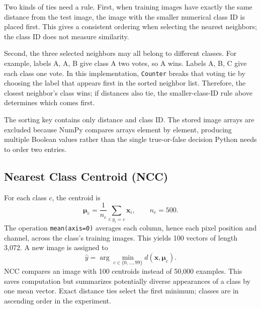 \documentclass[letterpaper,journal]{IEEEtran}
\newcommand{\code}[1]{\texttt{#1}}
\begin{document}
Two kinds of ties need a rule. First, when training images have exactly the
same distance from the test image, the image with the smaller numerical
class ID is placed first. This gives a consistent ordering when selecting
the nearest neighbors; the class ID does not measure similarity.

Second, the three selected neighbors may all belong to different classes.
For example, labels A, A, B give class A two votes, so A wins. Labels A, B, C
give each class one vote. In this implementation, \code{Counter} breaks
that voting tie by choosing the label that appears first in the sorted
neighbor list. Therefore, the closest neighbor's class wins; if distances
also tie, the smaller-class-ID rule above determines which comes first.

The sorting key contains only distance and class ID. The stored image arrays
are excluded because NumPy compares arrays element by element, producing
multiple Boolean values rather than the single true-or-false decision
Python needs to order two entries.

\subsection{Nearest Class Centroid (NCC)}
For each class $c$, the centroid is
\begin{equation}
\boldsymbol{\mu}_c=\frac{1}{n_c}\sum_{i:y_i=c}\mathbf{x}_i,
\qquad n_c=500.
\end{equation}
The operation \code{mean(axis=0)} averages each column, hence each pixel
position and channel, across the class's training images. This yields 100
vectors of length 3,072. A new image is assigned to
\begin{equation}
\widehat{y}=\arg\min_{c\in\{0,\ldots,99\}}
d(\mathbf{x},\boldsymbol{\mu}_c).
\end{equation}
NCC compares an image with 100 centroids instead of 50,000 examples. This
saves computation but summarizes potentially diverse appearances of a class
by one mean vector. Exact distance ties select the first minimum; classes
are in ascending order in the experiment.
\end{document}
